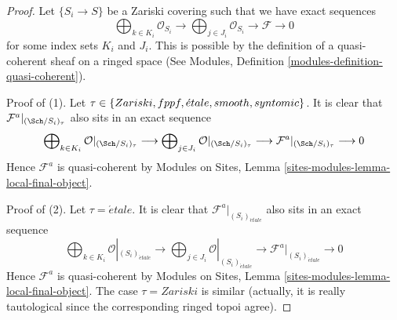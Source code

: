 \begin{proof}
Let $\{S_i \to S\}$ be a Zariski covering such that we have exact sequences
$$
\bigoplus\nolimits_{k \in K_i} \mathcal{O}_{S_i} \longrightarrow
\bigoplus\nolimits_{j \in J_i} \mathcal{O}_{S_i} \longrightarrow
\mathcal{F} \longrightarrow 0
$$
for some index sets $K_i$ and $J_i$. This is possible by the definition
of a quasi-coherent sheaf on a ringed space
(See Modules, Definition \ref{modules-definition-quasi-coherent}).

\medskip\noindent
Proof of (1). Let $\tau \in \{Zariski, \linebreak[0] fppf, \linebreak[0]
\acute{e}tale, \linebreak[0] smooth, \linebreak[0] syntomic\}$.
It is clear that $\mathcal{F}^a|_{(\Sch/S_i)_\tau}$ also
sits in an exact sequence
$$
\bigoplus\nolimits_{k \in K_i} \mathcal{O}|_{(\Sch/S_i)_\tau}
\longrightarrow
\bigoplus\nolimits_{j \in J_i} \mathcal{O}|_{(\Sch/S_i)_\tau}
\longrightarrow
\mathcal{F}^a|_{(\Sch/S_i)_\tau} \longrightarrow 0
$$
Hence $\mathcal{F}^a$ is quasi-coherent by Modules on Sites,
Lemma \ref{sites-modules-lemma-local-final-object}.

\medskip\noindent
Proof of (2). Let $\tau = \acute{e}tale$.
It is clear that $\mathcal{F}^a|_{(S_i)_{\acute{e}tale}}$ also sits
in an exact sequence
$$
\bigoplus\nolimits_{k \in K_i} \mathcal{O}|_{(S_i)_{\acute{e}tale}}
\longrightarrow
\bigoplus\nolimits_{j \in J_i} \mathcal{O}|_{(S_i)_{\acute{e}tale}}
\longrightarrow
\mathcal{F}^a|_{(S_i)_{\acute{e}tale}} \longrightarrow 0
$$
Hence $\mathcal{F}^a$ is quasi-coherent by Modules on Sites,
Lemma \ref{sites-modules-lemma-local-final-object}.
The case $\tau = Zariski$ is similar (actually, it is really
tautological since the corresponding ringed topoi agree).
\end{proof}

